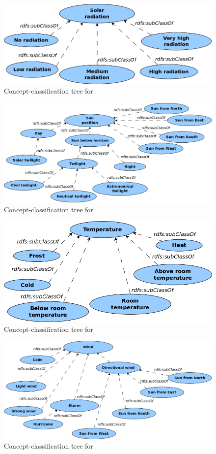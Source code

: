 \begin{figure}
  \centering
  \includegraphics[width=.8\textwidth]{figures/diagrams/solar-radiation.png}
  \caption{Concept-classification tree for }
  \label{fig:tree_solar_radiation}
\end{figure}

\begin{figure}
  \centering
  \includegraphics[width=.8\textwidth]{figures/diagrams/sun-position.png}
  \caption{Concept-classification tree for }
  \label{fig:tree_sun_position}
\end{figure}

\begin{figure}
  \centering
  \includegraphics[width=.8\textwidth]{figures/diagrams/temperature.png}
  \caption{Concept-classification tree for }
  \label{fig:tree_temperature}
\end{figure}

\begin{figure}
  \centering
  \includegraphics[width=\textwidth]{figures/diagrams/wind.png}
  \caption{Concept-classification tree for }
  \label{fig:tree_wind}
\end{figure}

